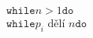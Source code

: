\documentclass[preview]{standalone}
\begin{document}
\begin{align*}
\mathtt{while} n > 1 \mathtt{do}\\\mathtt{while} p_i \text{ dělí } n \mathtt{do}
\end{align*}
\end{document}
